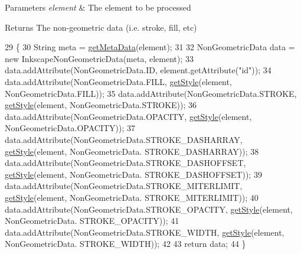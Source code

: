 \begin{DoxyParams}{Parameters}
{\em element} & The element to be processed \\
\hline
\end{DoxyParams}
\begin{DoxyReturn}{Returns}
The non-\/geometric data (i.\+e. stroke, fill, etc) 
\end{DoxyReturn}

\begin{DoxyCode}
29                                                                  \{
30         String meta = \mbox{\hyperlink{classorg_1_1newdawn_1_1slick_1_1svg_1_1inkscape_1_1_util_a93a7132a1178ccfeb1341987b00ef513}{getMetaData}}(element);
31         
32         NonGeometricData data = \textcolor{keyword}{new} InkscapeNonGeometricData(meta, element);
33         data.addAttribute(NonGeometricData.ID, element.getAttribute(\textcolor{stringliteral}{"id"}));
34         data.addAttribute(NonGeometricData.FILL, \mbox{\hyperlink{classorg_1_1newdawn_1_1slick_1_1svg_1_1inkscape_1_1_util_a868edc35f1d8da87bfbc5cff12514217}{getStyle}}(element, NonGeometricData.FILL));
35         data.addAttribute(NonGeometricData.STROKE, \mbox{\hyperlink{classorg_1_1newdawn_1_1slick_1_1svg_1_1inkscape_1_1_util_a868edc35f1d8da87bfbc5cff12514217}{getStyle}}(element, NonGeometricData.STROKE));
36         data.addAttribute(NonGeometricData.OPACITY, \mbox{\hyperlink{classorg_1_1newdawn_1_1slick_1_1svg_1_1inkscape_1_1_util_a868edc35f1d8da87bfbc5cff12514217}{getStyle}}(element, NonGeometricData.OPACITY));
37         data.addAttribute(NonGeometricData.STROKE\_DASHARRAY, \mbox{\hyperlink{classorg_1_1newdawn_1_1slick_1_1svg_1_1inkscape_1_1_util_a868edc35f1d8da87bfbc5cff12514217}{getStyle}}(element, NonGeometricData.
      STROKE\_DASHARRAY));
38         data.addAttribute(NonGeometricData.STROKE\_DASHOFFSET, \mbox{\hyperlink{classorg_1_1newdawn_1_1slick_1_1svg_1_1inkscape_1_1_util_a868edc35f1d8da87bfbc5cff12514217}{getStyle}}(element, NonGeometricData.
      STROKE\_DASHOFFSET));
39         data.addAttribute(NonGeometricData.STROKE\_MITERLIMIT, \mbox{\hyperlink{classorg_1_1newdawn_1_1slick_1_1svg_1_1inkscape_1_1_util_a868edc35f1d8da87bfbc5cff12514217}{getStyle}}(element, NonGeometricData.
      STROKE\_MITERLIMIT));
40         data.addAttribute(NonGeometricData.STROKE\_OPACITY, \mbox{\hyperlink{classorg_1_1newdawn_1_1slick_1_1svg_1_1inkscape_1_1_util_a868edc35f1d8da87bfbc5cff12514217}{getStyle}}(element, NonGeometricData.
      STROKE\_OPACITY));
41         data.addAttribute(NonGeometricData.STROKE\_WIDTH, \mbox{\hyperlink{classorg_1_1newdawn_1_1slick_1_1svg_1_1inkscape_1_1_util_a868edc35f1d8da87bfbc5cff12514217}{getStyle}}(element, NonGeometricData.
      STROKE\_WIDTH));
42         
43         \textcolor{keywordflow}{return} data;
44     \}
\end{DoxyCode}
\mbox{\label{classorg_1_1newdawn_1_1slick_1_1svg_1_1inkscape_1_1_util_a868edc35f1d8da87bfbc5cff12514217}} 
